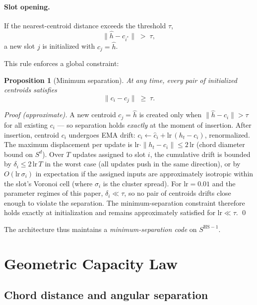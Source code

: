 \documentclass[11pt]{article}
\newtheorem{proposition}[theorem]{Proposition}
\begin{document}
\paragraph{Slot opening.}
If the nearest-centroid distance exceeds the threshold $\tau$,
\[
  \|\hat{h} - c_{i^*}\| \;>\; \tau,
\]
a new slot $j$ is initialized with $c_j = \hat{h}$.

This rule enforces a global constraint:

\begin{proposition}[Minimum separation]
  At any time, every pair of initialized centroids satisfies
  \[
    \|c_i - c_j\| \;\geq\; \tau.
  \]
\end{proposition}

\begin{proof}[Proof (approximate)]
  A new centroid $c_j = \hat{h}$ is created only when
  $\|\hat{h} - c_i\| > \tau$ for all existing $c_i$ --- so separation holds
  \emph{exactly} at the moment of insertion.
  After insertion, centroid $c_i$ undergoes EMA drift:
  $c_i \leftarrow \hat{c}_i + \mathrm{lr}\,(h_t - c_i)$, renormalized.
  The maximum displacement per update is $\mathrm{lr} \cdot \|h_t - c_i\| \leq 2\,\mathrm{lr}$
  (chord diameter bound on $S^d$).
  Over $T$ updates assigned to slot $i$, the cumulative drift is bounded by
  $\delta_i \leq 2\,\mathrm{lr}\,T$ in the worst case (all updates push in
  the same direction), or by $O(\mathrm{lr}\,\sigma_i)$ in expectation if
  the assigned inputs are approximately isotropic within the slot's
  Voronoi cell (where $\sigma_i$ is the cluster spread).
  For $\mathrm{lr} = 0.01$ and the parameter regimes of this paper,
  $\delta_i \ll \tau$, so no pair of centroids drifts close enough to violate
  the separation.
  The minimum-separation constraint therefore holds exactly at initialization
  and remains approximately satisfied for $\mathrm{lr} \ll \tau$.
  \qed
\end{proof}

\noindent
The architecture thus maintains a \emph{minimum-separation code} on $S^{\mathrm{HS}-1}$.

\section{Geometric Capacity Law}
\label{sec:geometry}

\subsection{Chord distance and angular separation}
\end{document}
